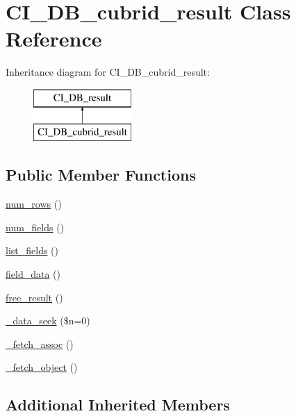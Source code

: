 \hypertarget{class_c_i___d_b__cubrid__result}{\section{C\-I\-\_\-\-D\-B\-\_\-cubrid\-\_\-result Class Reference}
\label{class_c_i___d_b__cubrid__result}
}
Inheritance diagram for C\-I\-\_\-\-D\-B\-\_\-cubrid\-\_\-result\-:\begin{figure}[H]
\begin{center}
\leavevmode
\includegraphics[height=2.000000cm]{class_c_i___d_b__cubrid__result}
\end{center}
\end{figure}
\subsection*{Public Member Functions}
\begin{DoxyCompactItemize}
\item 
\hyperlink{class_c_i___d_b__cubrid__result_a218657c303ee499b97710ab0cd2f5d6e}{num\-\_\-rows} ()
\item 
\hyperlink{class_c_i___d_b__cubrid__result_af831bf363e4d7d661a717a4932af449d}{num\-\_\-fields} ()
\item 
\hyperlink{class_c_i___d_b__cubrid__result_a50b54eb4ea7cfd039740f532988ea776}{list\-\_\-fields} ()
\item 
\hyperlink{class_c_i___d_b__cubrid__result_a84bffd65e53902ade1591716749a33e3}{field\-\_\-data} ()
\item 
\hyperlink{class_c_i___d_b__cubrid__result_aad2d98d6beb3d6095405356c6107b473}{free\-\_\-result} ()
\item 
\hyperlink{class_c_i___d_b__cubrid__result_aeba9dd69307793342d1c81ccb3e55ff9}{\-\_\-data\-\_\-seek} (\$n=0)
\item 
\hyperlink{class_c_i___d_b__cubrid__result_a43a9a92817f1334a1c10752ec44275a0}{\-\_\-fetch\-\_\-assoc} ()
\item 
\hyperlink{class_c_i___d_b__cubrid__result_a236bae79bb43606aa86598719b281c1f}{\-\_\-fetch\-\_\-object} ()
\end{DoxyCompactItemize}
\subsection*{Additional Inherited Members}


